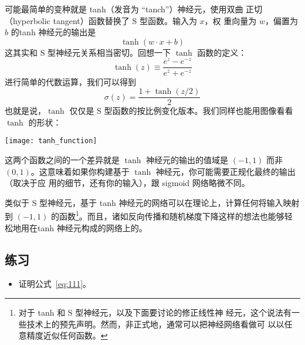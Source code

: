 可能最简单的变种就是 tanh（发音为 “tanch”）神经元，使用双曲
正切（hyperbolic tangent）函数替换了 S 型函数。输入为 $x$，权
重向量为 $w$，偏置为 $b$ 的tanh 神经元的输出是
\begin{equation}
  \tanh(w \cdot x+b)
  \label{eq:109}\tag{109}
\end{equation}
这其实和 S 型神经元关系相当密切。回想一下 $\tanh$ 函数的定义：
\begin{equation}
  \tanh(z) \equiv \frac{e^z-e^{-z}}{e^z+e^{-z}}
  \label{eq:110}\tag{110}
\end{equation}
进行简单的代数运算，我们可以得到
\begin{equation} 
  \sigma(z) = \frac{1+\tanh(z/2)}{2}
  \label{eq:111}\tag{111}
\end{equation}
也就是说，$\tanh$ 仅仅是 S 型函数的按比例变化版本。我们同样也能用图像看看
$\tanh$ 的形状：
\begin{center}
  \texttt{[image: tanh\_function]}
\end{center}

这两个函数之间的一个差异就是 $\tanh$ 神经元的输出的值域是 $(-1, 1)$ 而非 $(0,
1)$。这意味着如果你构建基于 $\tanh$ 神经元，你可能需要正规化最终的输出（取决于应
用的细节，还有你的输入），跟 sigmoid 网络略微不同。

类似于 S 型神经元，基于 tanh 神经元的网络可以在理论上，计算任何将输入映射
到 $(-1, 1)$ 的函数\footnote{对于 tanh 和 S 型神经元，以及下面要讨论的修正线性神
  经元，这个说法有一些技术上的预先声明。然而，非正式地，通常可以把神经网络看做可
  以以任意精度近似任何函数。}。而且，诸如反向传播和随机梯度下降这样的想法也能够轻
松地用在tanh 神经元构成的网络上的。

\subsection*{练习}

\begin{itemize}
\item 证明公式~\eqref{eq:111}。
\end{itemize}

